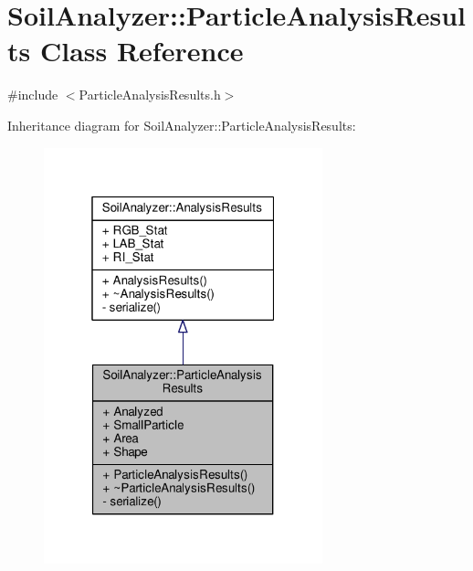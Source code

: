 \hypertarget{class_soil_analyzer_1_1_particle_analysis_results}{}\section{Soil\+Analyzer\+:\+:Particle\+Analysis\+Results Class Reference}
\label{class_soil_analyzer_1_1_particle_analysis_results}


{\ttfamily \#include $<$Particle\+Analysis\+Results.\+h$>$}



Inheritance diagram for Soil\+Analyzer\+:\+:Particle\+Analysis\+Results\+:\nopagebreak
\begin{figure}[H]
\begin{center}
\leavevmode
\includegraphics[width=229pt]{class_soil_analyzer_1_1_particle_analysis_results__inherit__graph}
\end{center}
\end{figure}


